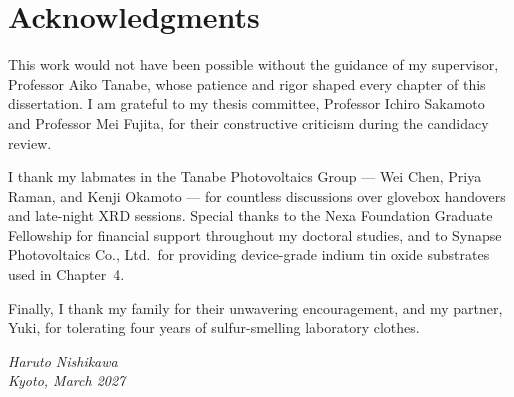 \chapter*{Acknowledgments}
\thispagestyle{plain}

This work would not have been possible without the guidance of my supervisor,
Professor Aiko Tanabe, whose patience and rigor shaped every chapter of this
dissertation. I am grateful to my thesis committee, Professor Ichiro Sakamoto
and Professor Mei Fujita, for their constructive criticism during the
candidacy review.

I thank my labmates in the Tanabe Photovoltaics Group --- Wei Chen, Priya
Raman, and Kenji Okamoto --- for countless discussions over glovebox
handovers and late-night XRD sessions. Special thanks to the Nexa Foundation
Graduate Fellowship for financial support throughout my doctoral studies, and
to Synapse Photovoltaics Co., Ltd.\ for providing device-grade indium tin
oxide substrates used in Chapter~4.

Finally, I thank my family for their unwavering encouragement, and my
partner, Yuki, for tolerating four years of sulfur-smelling laboratory
clothes.

\vspace{1cm}
\hfill \textit{Haruto Nishikawa}\\
\hfill \textit{Kyoto, March 2027}

\clearpage

